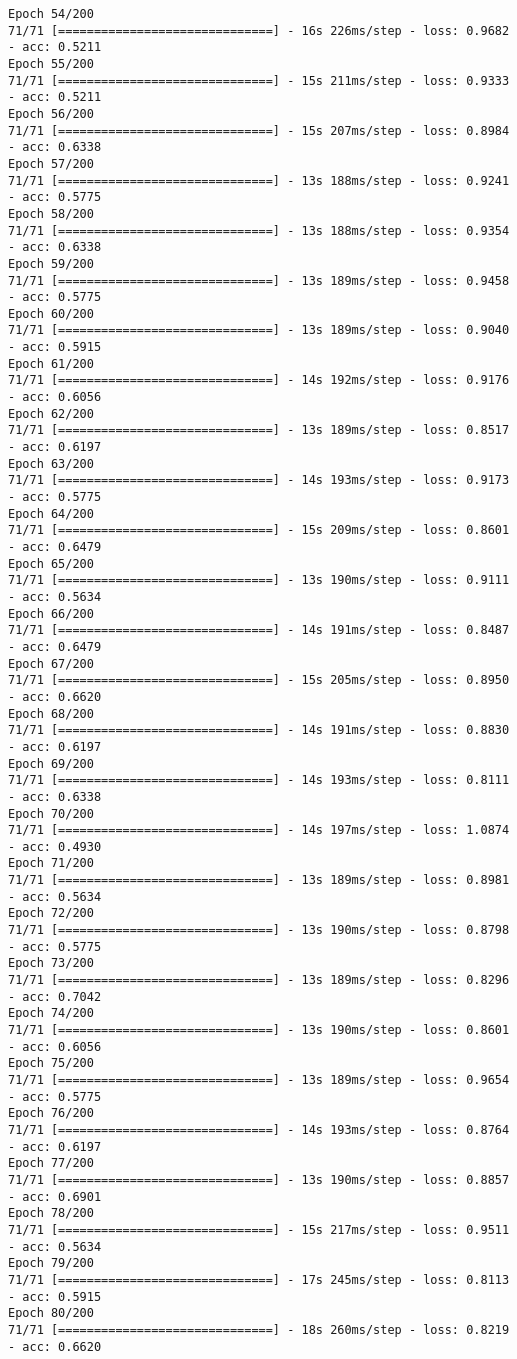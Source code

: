 \documentclass[11pt]{article}
\begin{document}
\begin{Verbatim}[commandchars=\\\{\}]
Epoch 54/200
71/71 [==============================] - 16s 226ms/step - loss: 0.9682 - acc: 0.5211
Epoch 55/200
71/71 [==============================] - 15s 211ms/step - loss: 0.9333 - acc: 0.5211
Epoch 56/200
71/71 [==============================] - 15s 207ms/step - loss: 0.8984 - acc: 0.6338
Epoch 57/200
71/71 [==============================] - 13s 188ms/step - loss: 0.9241 - acc: 0.5775
Epoch 58/200
71/71 [==============================] - 13s 188ms/step - loss: 0.9354 - acc: 0.6338
Epoch 59/200
71/71 [==============================] - 13s 189ms/step - loss: 0.9458 - acc: 0.5775
Epoch 60/200
71/71 [==============================] - 13s 189ms/step - loss: 0.9040 - acc: 0.5915
Epoch 61/200
71/71 [==============================] - 14s 192ms/step - loss: 0.9176 - acc: 0.6056
Epoch 62/200
71/71 [==============================] - 13s 189ms/step - loss: 0.8517 - acc: 0.6197
Epoch 63/200
71/71 [==============================] - 14s 193ms/step - loss: 0.9173 - acc: 0.5775
Epoch 64/200
71/71 [==============================] - 15s 209ms/step - loss: 0.8601 - acc: 0.6479
Epoch 65/200
71/71 [==============================] - 13s 190ms/step - loss: 0.9111 - acc: 0.5634
Epoch 66/200
71/71 [==============================] - 14s 191ms/step - loss: 0.8487 - acc: 0.6479
Epoch 67/200
71/71 [==============================] - 15s 205ms/step - loss: 0.8950 - acc: 0.6620
Epoch 68/200
71/71 [==============================] - 14s 191ms/step - loss: 0.8830 - acc: 0.6197
Epoch 69/200
71/71 [==============================] - 14s 193ms/step - loss: 0.8111 - acc: 0.6338
Epoch 70/200
71/71 [==============================] - 14s 197ms/step - loss: 1.0874 - acc: 0.4930
Epoch 71/200
71/71 [==============================] - 13s 189ms/step - loss: 0.8981 - acc: 0.5634
Epoch 72/200
71/71 [==============================] - 13s 190ms/step - loss: 0.8798 - acc: 0.5775
Epoch 73/200
71/71 [==============================] - 13s 189ms/step - loss: 0.8296 - acc: 0.7042
Epoch 74/200
71/71 [==============================] - 13s 190ms/step - loss: 0.8601 - acc: 0.6056
Epoch 75/200
71/71 [==============================] - 13s 189ms/step - loss: 0.9654 - acc: 0.5775
Epoch 76/200
71/71 [==============================] - 14s 193ms/step - loss: 0.8764 - acc: 0.6197
Epoch 77/200
71/71 [==============================] - 13s 190ms/step - loss: 0.8857 - acc: 0.6901
Epoch 78/200
71/71 [==============================] - 15s 217ms/step - loss: 0.9511 - acc: 0.5634
Epoch 79/200
71/71 [==============================] - 17s 245ms/step - loss: 0.8113 - acc: 0.5915
Epoch 80/200
71/71 [==============================] - 18s 260ms/step - loss: 0.8219 - acc: 0.6620

\end{Verbatim}
\end{document}
